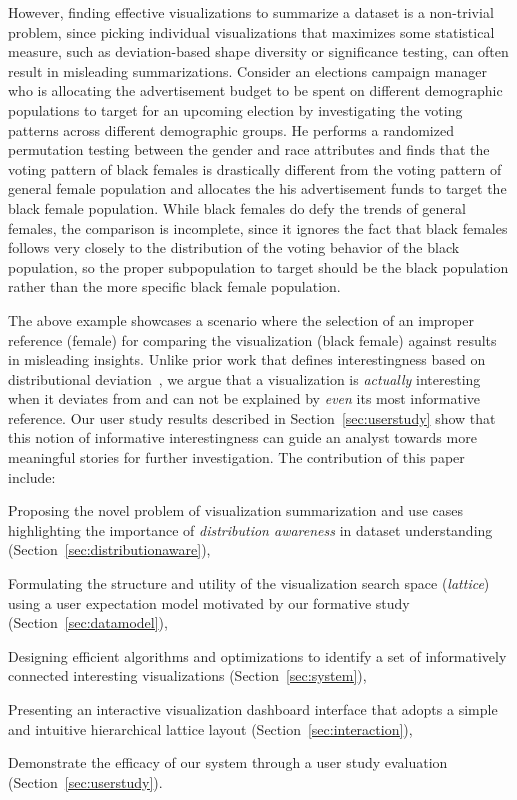 \par However, finding effective visualizations to summarize a dataset is a non-trivial problem, since picking individual visualizations that maximizes some statistical measure, such as deviation-based shape diversity or significance testing, can often result in misleading summarizations. Consider an elections campaign manager who is allocating the advertisement budget to be spent on different demographic populations to target for an upcoming election by investigating the voting patterns across different demographic groups. He performs a randomized permutation testing between the gender and race attributes and finds that the voting pattern of black females is drastically different from the voting pattern of general female population and allocates the his advertisement funds to target the black female population.  While black females do defy the trends of general females, the comparison is incomplete, since it ignores the fact that black females follows very closely to the distribution of the voting behavior of the black population, so the proper subpopulation to target should be the black population rather than the more specific black female population.
\par The above example showcases a scenario where the selection of an improper reference (female) for comparing the visualization (black female) against results in misleading insights. Unlike prior work that defines interestingness based on distributional deviation~\cite{Vartak2015,Anand2015}, we argue that a visualization is \emph{actually} interesting when it deviates from and can not be explained by \emph{even} its most informative reference. Our user study results described in Section~\ref{sec:userstudy} show that this notion of informative interestingness can guide an analyst towards more meaningful stories for further investigation. The contribution of this paper include: 
\begin{denselist}
\item Proposing the novel problem of visualization summarization and use cases highlighting the importance of \textit{distribution awareness} in dataset understanding (Section~\ref{sec:distributionaware}), %
\item Formulating the structure and utility of the visualization search space (\emph{lattice}) using a user expectation model motivated by our formative study (Section~\ref{sec:datamodel}),
\item Designing efficient algorithms and optimizations to identify a set of informatively connected interesting visualizations (Section~\ref{sec:system}),  
\item Presenting an interactive visualization dashboard interface that adopts a simple and intuitive hierarchical lattice layout (Section~\ref{sec:interaction}),
\item Demonstrate the efficacy of our system through a user study evaluation (Section~\ref{sec:userstudy}).
\end{denselist}